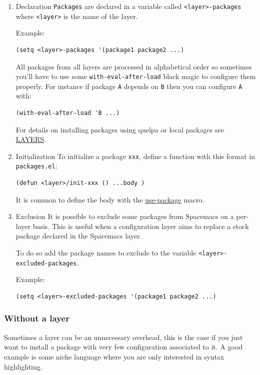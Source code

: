 \documentclass[11pt]{article}
\begin{document}
\begin{enumerate}
\item Declaration
\label{sec:org3717d51}
\texttt{Packages} are declared in a variable called \texttt{<layer>-packages} where \texttt{<layer>}
is the name of the layer.

Example:

\begin{verbatim}
(setq <layer>-packages '(package1 package2 ...)
\end{verbatim}

All packages from all layers are processed in alphabetical order so sometimes
you'll have to use some \texttt{with-eval-after-load} black magic to configure them
properly. For instance if package \texttt{A} depends on \texttt{B} then you can configure
\texttt{A} with:

\begin{verbatim}
(with-eval-after-load 'B ...)
\end{verbatim}

For details on installing packages using quelpa or local packages see \href{LAYERS.org}{LAYERS}.

\item Initialization
\label{sec:org8df144f}
To initialize a package \texttt{xxx}, define a function with this format in
\texttt{packages.el}:

\begin{verbatim}
(defun <layer>/init-xxx () ...body )
\end{verbatim}

It is common to define the body with the \href{https://github.com/jwiegley/use-package}{use-package} macro.

\item Exclusion
\label{sec:org8fcd62b}
It is possible to exclude some packages from Spacemacs on a per-layer basis.
This is useful when a configuration layer aims to replace a stock package
declared in the Spacemacs layer.

To do so add the package names to exclude to the variable
\texttt{<layer>-excluded-packages}.

Example:

\begin{verbatim}
(setq <layer>-excluded-packages '(package1 package2 ...)
\end{verbatim}
\end{enumerate}

\subsubsection{Without a layer}
\label{sec:org89982df}
Sometimes a layer can be an unnecessary overhead, this is the case if you just
want to install a package with very few configuration associated to it. A good
example is some niche language where you are only interested in syntax
highlighting.
\end{document}
